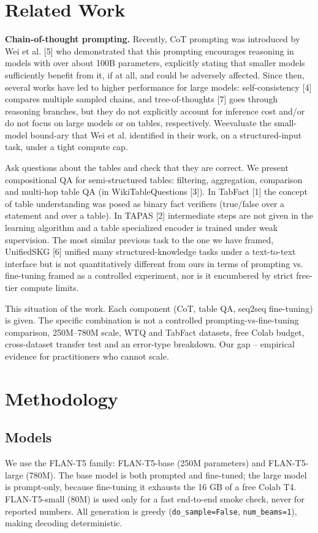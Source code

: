 \documentclass[sigconf]{acmart}
\begin{document}
\section{Related Work}
\textbf{Chain-of-thought prompting.} Recently, CoT prompting was introduced by Wei et al. [5] who demonstrated that this prompting encourages reasoning in models with over about 100B parameters, explicitly stating that smaller models sufficiently benefit from it, if at all, and could be adversely affected. Since then, several works have led to higher performance for large models: self-consistency [4] compares multiple sampled chains, and tree-of-thoughts [7] goes through reasoning branches, but they do not explicitly account for inference cost and/or do not focus on large models or on tables, respectively. Weevaluate the small-model bound-ary that Wei et al. identified in their work, on a structured-input task, under a tight compute cap.

Ask questions about the tables and check that they are correct. We present compositional QA for semi-structured tables: filtering, aggregation, comparison and multi-hop table QA (in WikiTableQuestions [3]). In TabFact [1] the concept of table understanding was posed as binary fact verifiers (true/false over a statement and over a table). In TAPAS [2] intermediate steps are not given in the learning algorithm and a table specialized encoder is trained under weak supervision. The most similar previous task to the one we have framed, UnifiedSKG [6] unified many structured-knowledge tasks under a text-to-text interface but is not quantitatively different from ours in terms of prompting vs. fine-tuning framed as a controlled experiment, nor is it encumbered by strict free-tier compute limits.

This situation of the work. Each component (CoT, table QA, seq2seq fine-tuning) is given. The specific combination is not a controlled prompting-vs-fine-tuning comparison, 250M--780M scale, WTQ and TabFact datasets, free Colab budget, cross-dataset transfer test and an error-type breakdown. Our gap -- empirical evidence for practitioners who cannot scale.

\section{Methodology}
\subsection{Models}
We use the FLAN-T5 family: FLAN-T5-base (250M parameters) and FLAN-T5-large (780M). The base model is both prompted and fine-tuned; the large model is prompt-only, because fine-tuning it exhausts the 16 GB of a free Colab T4. FLAN-T5-small (80M) is used only for a fast end-to-end smoke check, never for reported numbers. All generation is greedy (\texttt{do\_sample=False}, \texttt{num\_beams=1}), making decoding deterministic.
\end{document}
